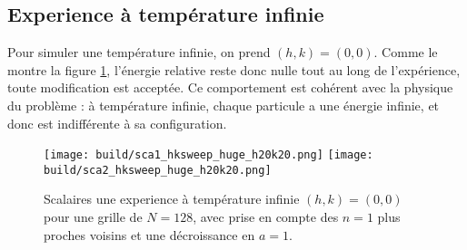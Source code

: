 \documentclass[a4paper, 11pt]{article}
\begin{document}
\subsection{Experience à température infinie}

Pour simuler une température infinie, on prend $(h, k) = (0, 0)$. Comme le montre la figure
\ref{fig:inf_en_sca}, l'énergie relative reste donc nulle tout au long de l'expérience, toute
modification est acceptée. Ce comportement est cohérent avec la physique du problème : à température
infinie, chaque particule a une énergie infinie, et donc est indifférente à sa configuration.

\begin{figure}
    \centering
    \texttt{[image: build/sca1\_hksweep\_huge\_h20k20.png]}
    \texttt{[image: build/sca2\_hksweep\_huge\_h20k20.png]}
    \caption{Scalaires une experience à température infinie $(h, k) = (0, 0)$ pour une grille de
    $N=128$, avec prise en compte des $n=1$ plus proches voisins et une décroissance en $a=1$.}
    \label{fig:inf_en_sca}
\end{figure}




\end{document}
